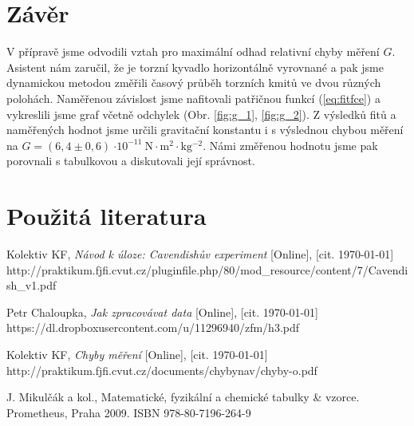 \documentclass[english]{article}
\newcommand{\unit}[1]{\mathrm{#1}}
\begin{document}
\section{Závěr}
	V přípravě jsme odvodili vztah pro maximální odhad relativní chyby měření $G$. Asistent nám zaručil, že je torzní kyvadlo horizontálně vyrovnané a pak jsme dynamickou metodou změřili časový průběh torzních kmitů ve dvou různých polohách. Naměřenou závislost jsme nafitovali patřičnou funkcí (\ref{eq:fitfce}) a vykreslili jsme graf včetně odchylek (Obr. \ref{fig:g_1}, \ref{fig:g_2}). Z výsledků fitů a naměřených hodnot jsme určili gravitační konstantu i s výslednou chybou měření na $G = (6,4 \pm 0,6)\ \unit{\cdot 10^{-11}\ N\cdot m^2\cdot kg^{-2}}$. Námi změřenou hodnotu jsme pak porovnali s tabulkovou a diskutovali její správnost.
	
	
\section {Použitá literatura}
\begingroup
\renewcommand{\section}[2]{}

\begin{thebibliography}{9}
 Kolektiv KF, \emph{Návod k úloze: Cavendishův experiment} [Online], [cit. \today] \newline 
http://praktikum.fjfi.cvut.cz/pluginfile.php/80/mod\_resource/content/7/Cavendish\_v1.pdf

 Petr Chaloupka, \emph{Jak zpracovávat data} [Online], [cit. \today] \newline 
https://dl.dropboxusercontent.com/u/11296940/zfm/h3.pdf


 Kolektiv KF, \emph{Chyby měření} [Online], [cit. \today] \newline http://praktikum.fjfi.cvut.cz/documents/chybynav/chyby-o.pdf

 J. Mikulčák a kol., Matematické, fyzikální a chemické tabulky \& vzorce. Prometheus,
Praha 2009.\newline
ISBN 978-80-7196-264-9

\end{thebibliography}
\endgroup
\end{document}
